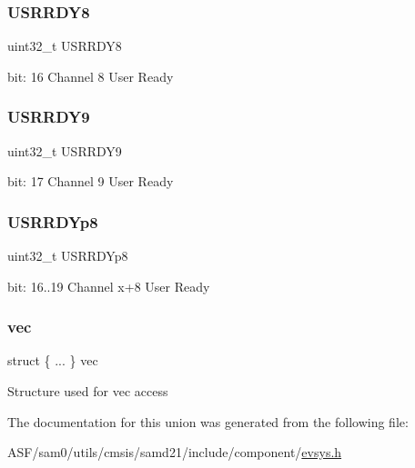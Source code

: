 \subsubsection{\texorpdfstring{USRRDY8}{USRRDY8}}
{\footnotesize\ttfamily uint32\+\_\+t U\+S\+R\+R\+D\+Y8}

bit\+: 16 Channel 8 User Ready \mbox{\label{union_e_v_s_y_s___c_h_s_t_a_t_u_s___type_ad8c162ecacf3e5bdfdd70079c968face}} 
\subsubsection{\texorpdfstring{USRRDY9}{USRRDY9}}
{\footnotesize\ttfamily uint32\+\_\+t U\+S\+R\+R\+D\+Y9}

bit\+: 17 Channel 9 User Ready \mbox{\label{union_e_v_s_y_s___c_h_s_t_a_t_u_s___type_a552cc0ab3525041d670d8bffa696abb8}} 
\subsubsection{\texorpdfstring{USRRDYp8}{USRRDYp8}}
{\footnotesize\ttfamily uint32\+\_\+t U\+S\+R\+R\+D\+Yp8}

bit\+: 16..19 Channel x+8 User Ready \mbox{\label{union_e_v_s_y_s___c_h_s_t_a_t_u_s___type_a0ce84c7e3b559466f40150ad84243ef0}} 
\subsubsection{\texorpdfstring{vec}{vec}}
{\footnotesize\ttfamily struct \{ ... \}   vec}

Structure used for vec access 

The documentation for this union was generated from the following file\+:\begin{DoxyCompactItemize}
\item 
A\+S\+F/sam0/utils/cmsis/samd21/include/component/\mbox{\hyperlink{component_2evsys_8h}{evsys.\+h}}\end{DoxyCompactItemize}
